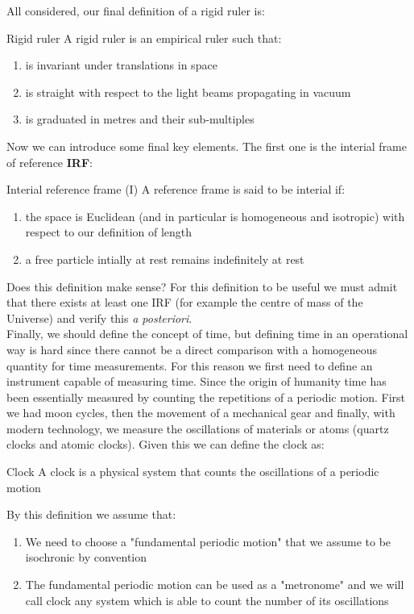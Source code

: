 All considered, our final definition of a rigid ruler is:
\begin{definition}{Rigid ruler}
  A rigid ruler is an empirical ruler such that:
  \begin{enumerate}
    \item is invariant under translations in space
    \item is straight with respect to the light beams propagating in vacuum
    \item is graduated in metres and their sub-multiples
  \end{enumerate}
\end{definition}
Now we can introduce some final key elements. The first one is the interial frame of reference \textbf{IRF}:
\begin{definition}{Interial reference frame (I)}
  A reference frame is said to be interial if:
  \begin{enumerate}
    \item the space is Euclidean (and in particular is homogeneous and isotropic) with respect to our definition of length
    \item a free particle intially at rest remains indefinitely at rest
  \end{enumerate}
\end{definition}
Does this definition make sense? For this definition to be useful we must admit that there exists at least one IRF (for example the centre of mass of the Universe) and verify this \textit{a posteriori}.\\
Finally, we should define the concept of time, but defining time in an operational way is hard since there cannot be a direct comparison with a homogeneous quantity for time measurements. For this reason we first need to define an instrument capable of measuring time. Since the origin of humanity time has been essentially measured by counting the repetitions of a periodic motion. First we had moon cycles, then the movement of a mechanical gear and finally, with modern technology, we measure the oscillations of materials or atoms (quartz clocks and atomic clocks). Given this we can define the clock as:
\begin{definition}{Clock}
  A clock is a physical system that counts the oscillations of a periodic motion
\end{definition}
By this definition we assume that:
\begin{enumerate}
  \item We need to choose a "fundamental periodic motion" that we assume to be isochronic by convention
  \item The fundamental periodic motion can be used as a "metronome" and we will call clock any system which
  is able to count the number of its oscillations
\end{enumerate}

